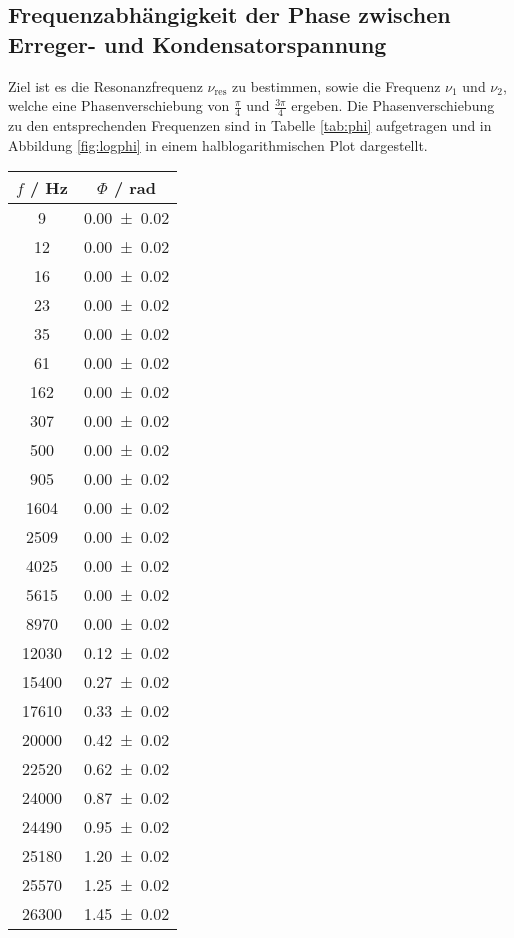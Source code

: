 \subsection{Frequenzabhängigkeit der Phase zwischen Erreger- und Kondensatorspannung}
Ziel ist es die Resonanzfrequenz $\nu_\text{res}$ zu bestimmen, sowie die Frequenz $\nu_1$ und $\nu_2$, welche eine Phasenverschiebung von $\frac{\pi}{4}$ und $\frac{3 \pi}{4}$ ergeben. Die Phasenverschiebung zu den entsprechenden Frequenzen sind in Tabelle \ref{tab:phi} aufgetragen und in Abbildung \ref{fig:logphi} in einem halblogarithmischen Plot dargestellt.
\begin{table}
  \centering
  \begin{tabular}{c c}
	\toprule
	$f$ / Hz & $\Phi$ / rad \\
	\midrule
	9   	& \num{0.00 +- 0.02} \\
	12  	& \num{0.00 +- 0.02} \\
	16  	& \num{0.00 +- 0.02} \\
	23  	& \num{0.00 +- 0.02} \\
	35  	& \num{0.00 +- 0.02} \\
	61  	& \num{0.00 +- 0.02} \\
	162 	& \num{0.00 +- 0.02} \\
	307	  & \num{0.00 +- 0.02} \\
	500 	& \num{0.00 +- 0.02} \\
	905 	& \num{0.00 +- 0.02} \\
	1604 	& \num{0.00 +- 0.02} \\
	2509 	& \num{0.00 +- 0.02} \\
	4025 	& \num{0.00 +- 0.02} \\
	5615 	& \num{0.00 +- 0.02} \\
	8970 	& \num{0.00 +- 0.02} \\
	12030	& \num{0.12 +- 0.02} \\
	15400 	& \num{0.27 +- 0.02} \\
	17610 	& \num{0.33 +- 0.02} \\
	20000 	& \num{0.42 +- 0.02} \\
	22520 	& \num{0.62 +- 0.02} \\
	24000 	& \num{0.87 +- 0.02} \\
	24490 	& \num{0.95 +- 0.02} \\
	25180 	& \num{1.20 +- 0.02} \\
	25570 	& \num{1.25 +- 0.02} \\
	26300 	& \num{1.45 +- 0.02} \\

\end{tabular}
\end{table}
